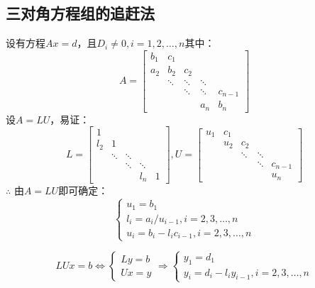 \documentclass[a4paper]{article}
\begin{document}
\subsection{三对角方程组的追赶法}
设有方程$Ax=d$，且$D_i\neq 0,i=1,2,\dots, n$其中：
$$A=\left[
  \begin{matrix}
    b_1 & c_1 \\
    a_2 & b_2 & c_2 \\
    ~ & \ddots & \ddots & \ddots \\
    ~ & ~ & \ddots & \ddots & c_{n-1} \\
    ~ & ~ & & a_n & b_n
  \end{matrix}
  \right]$$
设$A=LU$，易证：
$$L=\left[
  \begin{matrix}
    1 \\
    l_2 & 1 \\
    & \ddots & \ddots \\
    & & \ddots & \ddots \\
    & & & l_n & 1
  \end{matrix}
  \right], U = \left[
    \begin{matrix}
      u_1 & c_1 \\
      & u_2 & c_2 \\
      & & \ddots & \ddots \\
      & & & \ddots & c_{n-1} \\
      & & & & u_n
    \end{matrix}
    \right]
$$
$\therefore$ 由$A=LU$即可确定：
\begin{equation}
  \left\{
  \begin{array}{lr}
    u_1 = b_1 \\
    l_i = a_i/u_{i-1}, i=2,3,\dots, n \\
    u_i = b_i-l_ic_{i-1}, i=2,3,\dots,n
  \end{array}\right.
  \label{eq:4.8}
\end{equation}

\begin{equation}
  LUx = b \Leftrightarrow \left\{
    \begin{array}{lr}
      Ly = b \\
      Ux = y 
    \end{array}
    \right. \Rightarrow \left\{
    \begin{array}{lr}
      y_1 = d_1 \\
      y_i=d_i-l_iy_{i-1}, i=2,3,\dots, n
    \end{array}\right.
    \label{eq:4.9}
\end{equation}
\end{document}
